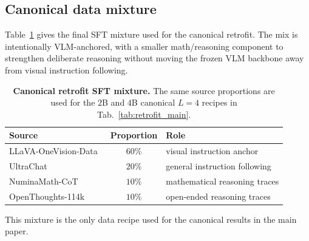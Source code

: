\documentclass{article}
\begin{document}
\subsection{Canonical data mixture}
\label{app:data_mix}

Table~\ref{tab:data_mix_ablation} gives the final SFT mixture used for the canonical retrofit. The mix is intentionally VLM-anchored, with a smaller math/reasoning component to strengthen deliberate reasoning without moving the frozen VLM backbone away from visual instruction following.

\begin{table}[h]
\caption{\textbf{Canonical retrofit SFT mixture.} The same source proportions are used for the $2$B and $4$B canonical $L{=}4$ recipes in Tab.~\ref{tab:retrofit_main}.}
\label{tab:data_mix_ablation}
\centering\small
\setlength{\tabcolsep}{6pt}
\begin{tabular}{lcl}
\toprule
Source & Proportion & Role \\
\midrule
LLaVA-OneVision-Data~\citep{li2024llavaonevision} & $60\%$ & visual instruction anchor \\
UltraChat~\citep{ding2023ultrachat} & $20\%$ & general instruction following \\
NuminaMath-CoT~\citep{aimo2024numinamath} & $10\%$ & mathematical reasoning traces \\
OpenThoughts-114k~\citep{guha2025openthoughts} & $10\%$ & open-ended reasoning traces \\
\bottomrule
\end{tabular}
\end{table}

This mixture is the only data recipe used for the canonical results in the main paper.
\end{document}
